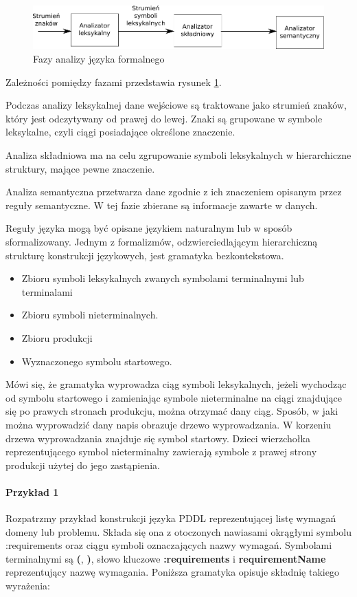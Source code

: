\begin{figure}[h]
  \centering
    \includegraphics[width=\textwidth]{img/antlr_phases.pdf}
    \caption{Fazy analizy języka formalnego}
    \label{antlr_phases}
\end{figure}

Zależności pomiędzy fazami przedstawia rysunek \ref{antlr_phases}. 

Podczas analizy leksykalnej dane wejściowe są traktowane jako strumień znaków, który
jest odczytywany od prawej do lewej. Znaki są grupowane w symbole leksykalne, czyli
ciągi posiadające określone znaczenie.

Analiza składniowa ma na celu zgrupowanie symboli leksykalnych w hierarchiczne struktury,
mające pewne znaczenie.

Analiza semantyczna przetwarza dane zgodnie z ich znaczeniem opisanym przez reguły
semantyczne. W tej fazie zbierane są informacje zawarte w danych.

Reguły języka mogą być opisane językiem naturalnym lub w sposób sformalizowany.
Jednym z formalizmów, odzwierciedlającym hierarchiczną strukturę konstrukcji językowych,
jest gramatyka bezkontekstowa. 

\begin{itemize}
\item Zbioru symboli leksykalnych zwanych symbolami terminalnymi lub terminalami
\item Zbioru symboli nieterminalnych.
\item Zbioru produkcji %
\item Wyznaczonego symbolu startowego.
\end{itemize}

Mówi się, że gramatyka wyprowadza ciąg symboli leksykalnych, jeżeli wychodząc 
od symbolu startowego i zamieniając symbole nieterminalne na ciągi znajdujące 
się po prawych stronach produkcju, można otrzymać dany ciąg. Sposób, w jaki
można wyprowadzić dany napis obrazuje drzewo wyprowadzania. W korzeniu drzewa wyprowadzania
znajduje się symbol startowy. Dzieci wierzchołka reprezentującego symbol nieterminalny
zawierają symbole z prawej strony produkcji użytej do jego zastąpienia.

\paragraph{Przykład 1}
Rozpatrzmy przykład konstrukcji języka PDDL reprezentującej listę wymagań domeny lub problemu.
Składa się ona z otoczonych nawiasami okrągłymi symbolu :requirements oraz
ciągu symboli oznaczających nazwy wymagań. Symbolami terminalnymi są 
\textbf{(}, \textbf{)}, słowo kluczowe \textbf{:requirements} i 
\textbf{requirementName} reprezentujący nazwę wymagania. Poniższa gramatyka opisuje
składnię takiego wyrażenia:

